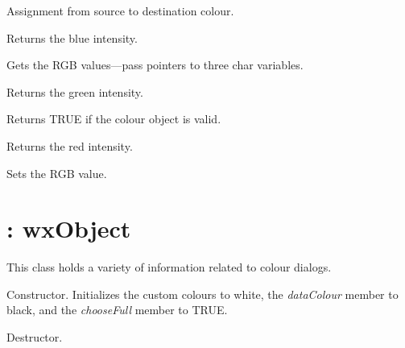 Assignment from source to destination colour.



Returns the blue intensity.



Gets the RGB values---pass pointers to three char variables.



Returns the green intensity.



Returns TRUE if the colour object is valid.



Returns the red intensity.



Sets the RGB value.


\section{: wxObject}\label{wxcolourdata}


This class holds a variety of information related to colour dialogs.



Constructor. Initializes the custom colours to white, the {\it dataColour} member
to black, and the {\it chooseFull} member to TRUE.



Destructor.


